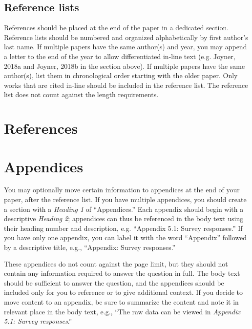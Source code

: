 \documentclass[
	letterpaper, %
]{jdf}
\begin{document}
\subsection{Reference lists}
References should be placed at the end of the paper in a dedicated section. Reference lists should be numbered and organized alphabetically by first author’s last name. If multiple papers have the same author(s) and year, you may append a letter to the end of the year to allow differentiated in-line text (e.g. Joyner, 2018a and Joyner, 2018b in the section above). If multiple papers have the same author(s), list them in chronological order starting with the older paper. Only works that are cited in-line should be included in the reference list. The reference list does not count against the length requirements.

\section{References}
\printbibliography[heading=none]

\section{Appendices}
You may optionally move certain information to appendices at the end of your paper, after the reference list. If you have multiple appendices, you should create a section with a \emph{Heading 1} of “Appendices.” Each appendix should begin with a descriptive \emph{Heading 2}; appendices can thus be referenced in the body text using their heading number and description, e.g. “Appendix 5.1: Survey responses.” If you have only one appendix, you can label it with the word “Appendix” followed by a descriptive title, e.g., “Appendix: Survey responses.”

These appendices do not count against the page limit, but they should not contain any information required to answer the question in full. The body text should be sufficient to answer the question, and the appendices should be included only for you to reference or to give additional context. If you decide to move content to an appendix, be sure to summarize the content and note it in relevant place in the body text, e.g., “The raw data can be viewed in \emph{Appendix 5.1: Survey responses}.”
\end{document}
